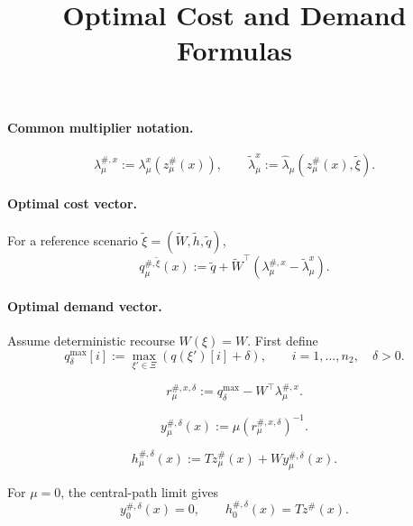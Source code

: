 \documentclass{article}
\title{Optimal Cost and Demand Formulas}
\date{}
\begin{document}
\maketitle

\paragraph{Common multiplier notation.}
\[
\lambda_\mu^{\#,x}:=\lambda_\mu^x\!\left(z_\mu^\#(x)\right),
\qquad
\widetilde\lambda_\mu^x
:=
\hat\lambda_\mu\!\left(z_\mu^\#(x),\tilde\xi\right).
\]

\paragraph{Optimal cost vector.}
For a reference scenario \(\tilde\xi=(\widetilde W,\widetilde h,\widetilde q)\),
\[
q_\mu^{\#,\tilde\xi}(x)
:=
\widetilde q
+
\widetilde W^\top
\left(
\lambda_\mu^{\#,x}-\widetilde\lambda_\mu^x
\right).
\]

\paragraph{Optimal demand vector.}
Assume deterministic recourse \(W(\xi)=W\). First define
\[
q_\delta^{\max}[i]
:=
\max_{\xi'\in\Xi}\left(q(\xi')[i]+\delta\right),
\qquad i=1,\ldots,n_2,\quad \delta>0.
\]

\[
r_\mu^{\#,x,\delta}
:=
q_\delta^{\max}-W^\top\lambda_\mu^{\#,x}.
\]

\[
y_\mu^{\#,\delta}(x)
:=
\mu\left(r_\mu^{\#,x,\delta}\right)^{-1}.
\]

\[
h_\mu^{\#,\delta}(x)
:=
Tz_\mu^\#(x)+Wy_\mu^{\#,\delta}(x).
\]

For \(\mu=0\), the central-path limit gives
\[
y_0^{\#,\delta}(x)=0,
\qquad
h_0^{\#,\delta}(x)=Tz^\#(x).
\]
\end{document}
